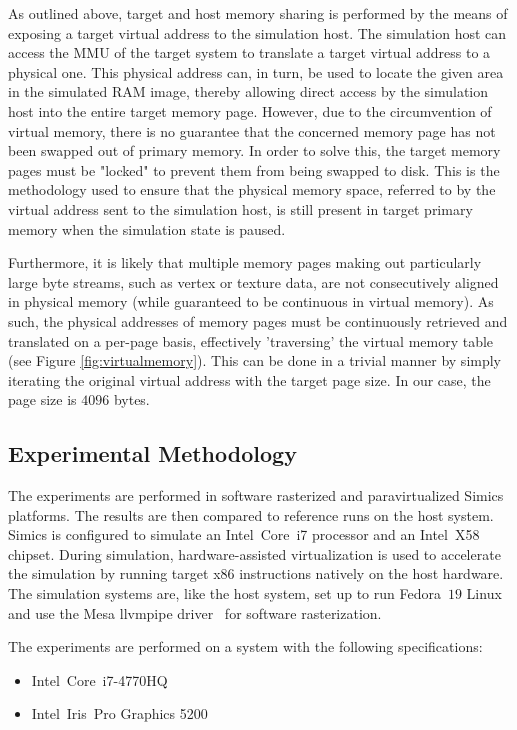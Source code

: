 \documentclass{article}
\newcommand{\masccite}[2][]{\cite{#2}}
\begin{document}
As outlined above, target and host memory sharing is performed by the means of exposing a target virtual address to the simulation host.
The simulation host can access the MMU of the target system to translate a target virtual address to a physical one.
This physical address can, in turn, be used to locate the given area in the simulated RAM image, thereby allowing direct access by the simulation host into the entire target memory page.
However, due to the circumvention of virtual memory, there is no guarantee that the concerned memory page has not been swapped out of primary memory.
In order to solve this, the target memory pages must be "locked" to prevent them from being swapped to disk.
This is the methodology used to ensure that the physical memory space, referred to by the virtual address sent to the simulation host, is still present in target primary memory when the simulation state is paused.

Furthermore, it is likely that multiple memory pages making out particularly large byte streams, such as vertex or texture data, are not consecutively aligned in physical memory (while guaranteed to be continuous in virtual memory).
As such, the physical addresses of memory pages must be continuously retrieved and translated on a per-page basis, effectively 'traversing' the virtual memory table (see Figure \ref{fig:virtualmemory}).
This can be done in a trivial manner by simply iterating the original virtual address with the target page size.
In our case, the page size is $4096$ bytes.

\subsection{Experimental Methodology}
\label{sec:experimentalmethodology}
The experiments are performed in software rasterized and paravirtualized Simics platforms.
The results are then compared to reference runs on the host system.
Simics is configured to simulate an Intel\circledR ~Core\texttrademark ~i7 processor and an Intel\circledR ~X58 chipset.
During simulation, hardware-assisted virtualization is used to accelerate the simulation by running target x86 instructions natively on the host hardware.
The simulation systems are, like the host system, set up to run Fedora~$19$ Linux and use the Mesa llvmpipe driver~\masccite{web:mesa:2015} for software rasterization.

The experiments are performed on a system with the following specifications:
\begin{itemize}
\item Intel\circledR\ Core\texttrademark\ i7-4770HQ
\item Intel\circledR\ Iris\texttrademark\ Pro Graphics 5200
\end{itemize}
\end{document}

